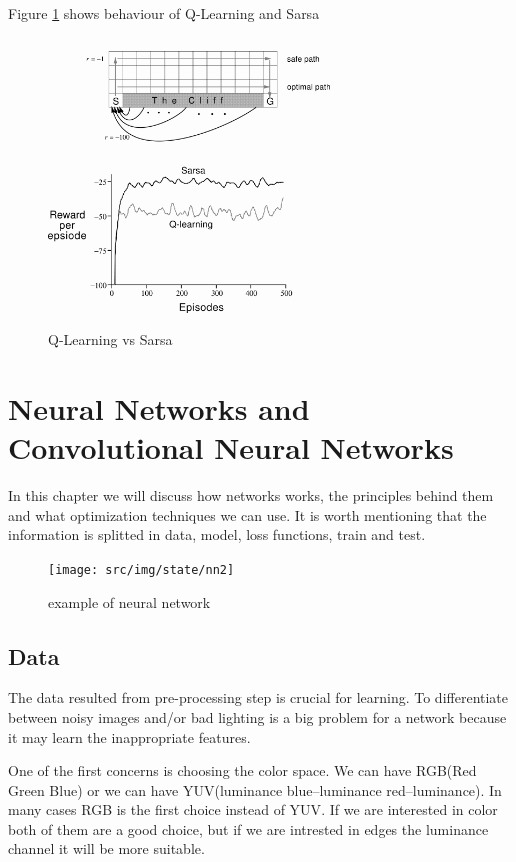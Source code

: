 Figure \ref{fig:svsq} shows behaviour of Q-Learning and Sarsa 

\begin{figure}[h]
	\begin{center}
		\includegraphics[width=282px,height=288px]{src/img/state/qsrewards}
		\caption{Q-Learning vs Sarsa\cite{sutton}} \label{fig:svsq}
    \end{center}
\end{figure}


\section{Neural Networks and Convolutional Neural Networks}

In this chapter we will discuss how networks works, the principles behind them and what optimization techniques we can use. It is worth mentioning that the information is splitted in data, model, loss functions, train and test.
\begin{figure}[h]
	\begin{center}
		\texttt{[image: src/img/state/nn2]}
		\caption{example of neural network} \label{fig:nn}
    \end{center}
\end{figure}

\subsection{Data}
\label{data}
The data resulted from pre-processing step is crucial for learning. To differentiate between noisy images and/or bad lighting is a big problem for a network because it may learn the inappropriate features.

One of the first concerns is choosing the color space. We can have RGB(Red Green Blue) or we can have YUV(luminance blue–luminance red–luminance). In many cases RGB is the first choice instead of YUV\cite{pipeline}. If we are interested in color both of them are a good choice, but if we are intrested in edges the luminance channel it will be more suitable.

